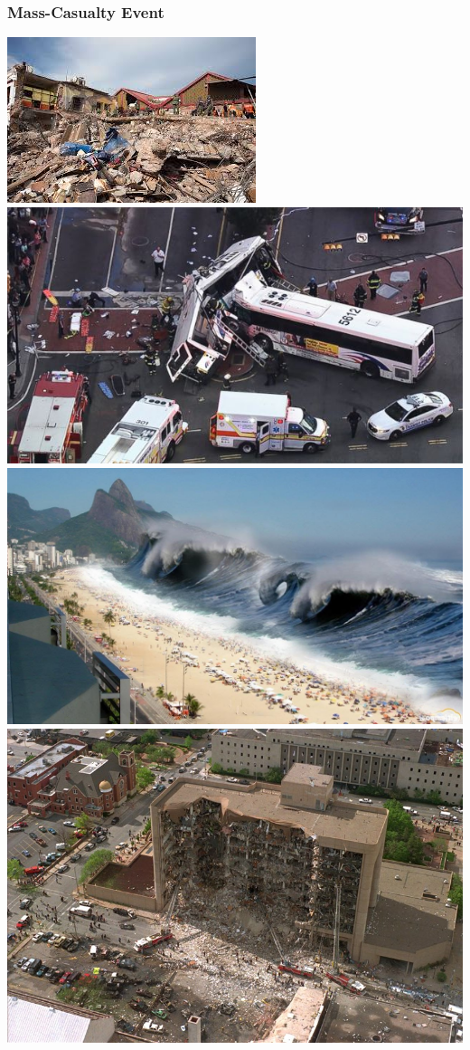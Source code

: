 \documentclass{beamer}
\begin{document}
\begin{frame}
\titlepage %
\end{frame}


%


\begin{frame}
\frametitle{Mass-Casualty Event}
\includegraphics[width = .49\textwidth, height = .3\textwidth]{earthquake}
\includegraphics[width = .49\textwidth, height = .3\textwidth]{busaccident}
\includegraphics[width = .49\textwidth, height = .3\textwidth]{tsunami}
\includegraphics[width = .49\textwidth, height = .3\textwidth]{bombing}
\end{frame}
\end{document}
